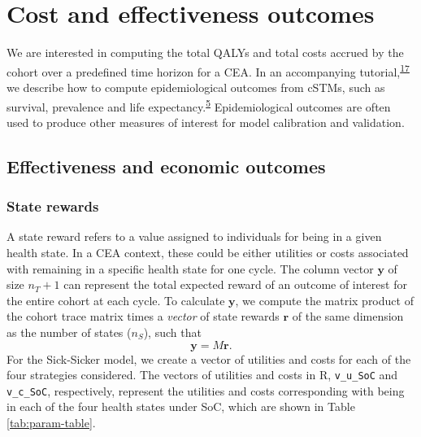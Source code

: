 \documentclass[
]{article}
\begin{document}
\hypertarget{cost-and-effectiveness-outcomes}{%
\section{Cost and effectiveness outcomes}\label{cost-and-effectiveness-outcomes}}

We are interested in computing the total QALYs and total costs accrued by the cohort over a predefined time horizon for a CEA. In an accompanying tutorial,\textsuperscript{\protect\hyperlink{ref-Alarid-Escudero2021b}{17}} we describe how to compute epidemiological outcomes from cSTMs, such as survival, prevalence and life expectancy.\textsuperscript{\protect\hyperlink{ref-Siebert2012c}{5}} Epidemiological outcomes are often used to produce other measures of interest for model calibration and validation.

\hypertarget{effectiveness-and-economic-outcomes}{%
\subsection{Effectiveness and economic outcomes}\label{effectiveness-and-economic-outcomes}}

\hypertarget{state-rewards}{%
\subsubsection{State rewards}\label{state-rewards}}

A state reward refers to a value assigned to individuals for being in a given health state. In a CEA context, these could be either utilities or costs associated with remaining in a specific health state for one cycle. The column vector \(\mathbf{y}\) of size \(n_T+1\) can represent the total expected reward of an outcome of interest for the entire cohort at each cycle. To calculate \(\mathbf{y}\), we compute the matrix product of the cohort trace matrix times a \emph{vector} of state rewards \(\mathbf{r}\) of the same dimension as the number of states (\(n_S\)), such that
\begin{equation}
  \mathbf{y} = M\mathbf{r}.
  \label{eq:exp-rew-cycle}
\end{equation}
For the Sick-Sicker model, we create a vector of utilities and costs for each of the four strategies considered. The vectors of utilities and costs in R, \texttt{v\_u\_SoC} and \texttt{v\_c\_SoC}, respectively, represent the utilities and costs corresponding with being in each of the four health states under SoC, which are shown in Table \ref{tab:param-table}.
\end{document}
